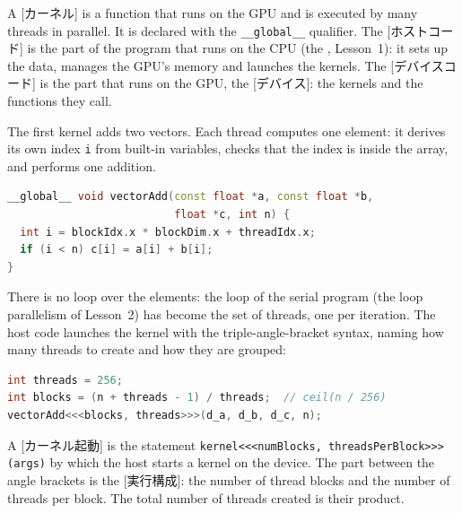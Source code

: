 \documentclass[../main.tex]{subfiles}
\begin{document}
\begin{definition}
  A [カーネル] is a function that runs on the GPU and is
  executed by many threads in parallel.  It is declared with the
  \texttt{\_\_global\_\_} qualifier.  The [ホストコード]
  is the part of the program that runs on the CPU (the ,
  Lesson~1): it sets up the data, manages the GPU's memory and launches
  the kernels.  The [デバイスコード] is the part that
  runs on the GPU, the [デバイス]: the kernels and the
  functions they call.
\end{definition}

The first kernel adds two vectors.  Each thread computes one element: it
derives its own index \texttt{i} from built-in variables, checks that the
index is inside the array, and performs one addition.
\begin{lstlisting}[language=C++, numbers=none]
__global__ void vectorAdd(const float *a, const float *b,
                          float *c, int n) {
  int i = blockIdx.x * blockDim.x + threadIdx.x;
  if (i < n) c[i] = a[i] + b[i];
}
\end{lstlisting}
There is no loop over the elements: the loop of the serial program (the
loop parallelism of Lesson~2) has become the set of threads, one per
iteration.  The host code launches the kernel with the triple-angle-bracket
syntax, naming how many threads to create and how they are grouped:
\begin{lstlisting}[language=C++, numbers=none]
int threads = 256;
int blocks = (n + threads - 1) / threads;  // ceil(n / 256)
vectorAdd<<<blocks, threads>>>(d_a, d_b, d_c, n);
\end{lstlisting}

\begin{definition}
  A [カーネル起動] is the statement
  \texttt{kernel<<<numBlocks, threadsPerBlock>>>(args)} by which the host
  starts a kernel on the device.  The part between the angle brackets is
  the [実行構成]: the number of thread
  blocks and the number of threads per block.  The total number of
  threads created is their product.
\end{definition}
\end{document}
